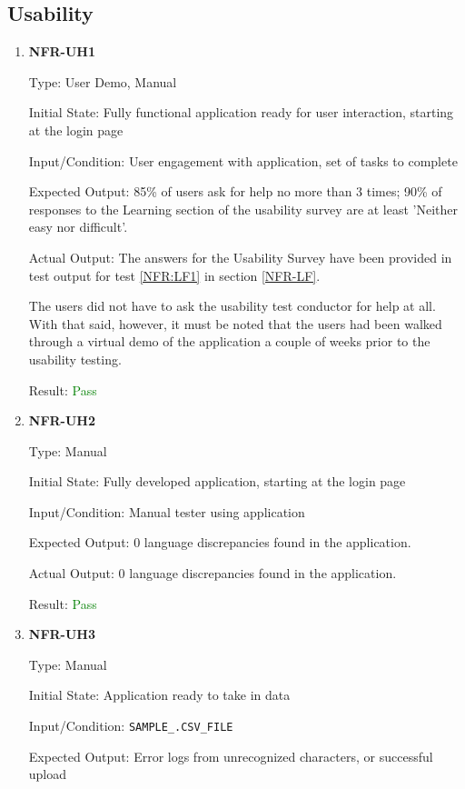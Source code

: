 \documentclass[12pt, titlepage]{article}
\begin{document}
\subsection{Usability}
\begin{enumerate}
\item{\textbf{NFR-UH1}} \label{NFR:UH1}

Type: User Demo, Manual

Initial State: Fully functional application ready for user interaction, starting
at the login page

Input/Condition: User engagement with application, set of tasks to complete

Expected Output: 85\% of users ask for help no more than 3 times; 90\% of
responses to the Learning section of the usability survey are at least 'Neither
easy nor difficult'.

Actual Output: \newline
The answers for the Usability Survey have been provided in test output for test \ref{NFR:LF1} in section \ref{NFR-LF}.

The users did not have to ask the usability test conductor for help at all. With that said, however, it must be noted 
that the users had been walked through a virtual demo of the application a couple of weeks prior to the usability testing.

Result: \textcolor{green}{Pass}

\item{\textbf{NFR-UH2}} \label{NFR:UH2}

Type: Manual
  
Initial State: Fully developed application, starting at the login page
  
Input/Condition: Manual tester using application

Expected Output: 0 language discrepancies found in the application.
  
Actual Output: 0 language discrepancies found in the application.

Result: \textcolor{green}{Pass}

\item{\textbf{NFR-UH3}} \label{NFR:UH3}

Type: Manual

Initial State: Application ready to take in data

Input/Condition: \texttt{SAMPLE\_.CSV\_FILE}

Expected Output: Error logs from unrecognized characters, or successful upload


\end{enumerate}
\end{document}
